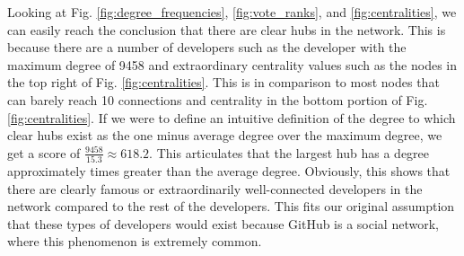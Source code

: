 \documentclass[9pt,twocolumn,twoside]{pnas-new}
\begin{document}
Looking at Fig. \ref{fig:degree_frequencies}, \ref{fig:vote_ranks}, and \ref{fig:centralities}, we can easily reach the conclusion that there are clear hubs in the network. This is because there are a number of developers such as the developer with the maximum degree of 9458 and extraordinary centrality values such as the nodes in the top right of Fig. \ref{fig:centralities}. This is in comparison to most nodes that can barely reach 10 connections and centrality in the bottom portion of Fig. \ref{fig:centralities}. If we were to define an intuitive definition of the degree to which clear hubs exist as the one minus average degree over the maximum degree, we get a score of $\frac{9458}{15.3} \approx 618.2$. This articulates that the largest hub has a degree approximately times greater than the average degree. Obviously, this shows that there are clearly famous or extraordinarily well-connected developers in the network compared to the rest of the developers. This fits our original assumption that these types of developers would exist because GitHub is a social network, where this phenomenon is extremely common.

%
\end{document}
